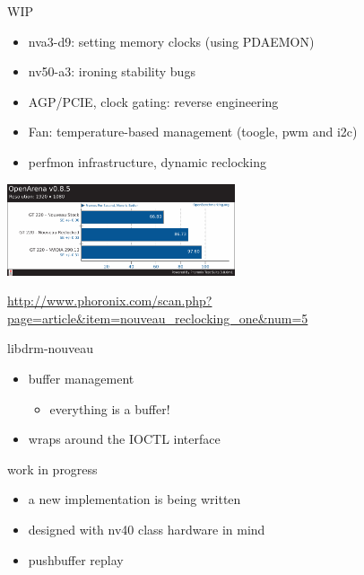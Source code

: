 \documentclass[11pt,english,compress]{beamer}
\begin{document}
		\begin{frame}
			\begin{block}{WIP}
				\begin{itemize}
					\item nva3-d9: setting memory clocks (using PDAEMON)
					\item nv50-a3: ironing stability bugs 
					\item AGP/PCIE, clock gating: reverse engineering
					\item Fan: temperature-based management (toogle, pwm and i2c)
					\item perfmon infrastructure, dynamic reclocking
				\end{itemize}
			\end{block}

			\begin{center}
				\includegraphics[height=2.7cm]{imgs/gt220_openarena_bench.pdf}
			\end{center}
			\begin{center}
				\url{http://www.phoronix.com/scan.php?page=article&item=nouveau_reclocking_one&num=5}
			\end{center}

		\end{frame}

		\begin{frame}
			\begin{block}{libdrm-nouveau}
				\begin{itemize}
					\item buffer management
						\begin{itemize}
							\item everything is a buffer!
						\end{itemize}
					\item wraps around the IOCTL interface
				\end{itemize}
			\end{block}
			\begin{block}{work in progress}
				\begin{itemize}
					\item a new implementation is being written
					\item designed with nv40 class hardware in mind
					\item pushbuffer replay
				\end{itemize}
			\end{block}
		\end{frame}
\end{document}
